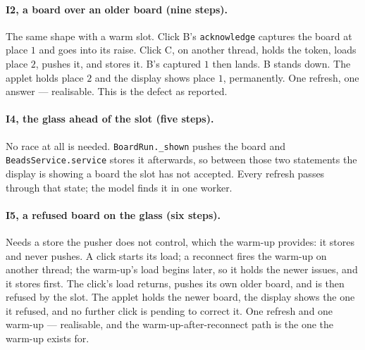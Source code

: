 \documentclass[a4paper,10pt,fleqn]{article}
\begin{document}
\paragraph{I2, a board over an older board (nine steps).}
The same shape with a warm slot. Click B's \texttt{acknowledge} captures the
board at place $1$ and goes into its raise. Click C, on another thread, holds
the token, loads place $2$, pushes it, and stores it. B's captured $1$ then
lands. B stands down. The applet holds place $2$ and the display shows place
$1$, permanently. One refresh, one answer --- realisable. This is the defect as
reported.

\paragraph{I4, the glass ahead of the slot (five steps).}
No race at all is needed. \texttt{BoardRun.\_shown} pushes the board and
\texttt{BeadsService.service} stores it afterwards, so between those two
statements the display is showing a board the slot has not accepted. Every
refresh passes through that state; the model finds it in one worker.

\paragraph{I5, a refused board on the glass (six steps).}
Needs a store the pusher does not control, which the warm-up provides: it
stores and never pushes. A click starts its load; a reconnect fires the warm-up
on another thread; the warm-up's load begins later, so it holds the newer
issues, and it stores first. The click's load returns, pushes its own older
board, and is then refused by the slot. The applet holds the newer board, the
display shows the one it refused, and no further click is pending to correct it.
One refresh and one warm-up --- realisable, and the warm-up-after-reconnect path
is the one the warm-up exists for.
\end{document}
